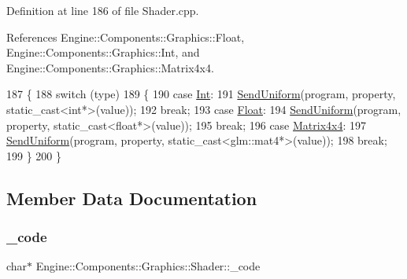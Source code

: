 Definition at line 186 of file Shader.\+cpp.



References Engine\+::\+Components\+::\+Graphics\+::\+Float, Engine\+::\+Components\+::\+Graphics\+::\+Int, and Engine\+::\+Components\+::\+Graphics\+::\+Matrix4x4.


\begin{DoxyCode}
187 \{
188     \textcolor{keywordflow}{switch} (type)
189     \{
190         \textcolor{keywordflow}{case} \mbox{\hyperlink{namespaceEngine_1_1Components_1_1Graphics_a44f5a2b57ee82aed849896c8311e403ba97d63336b89a741ffe735bc436147cc6}{Int}}:
191             \mbox{\hyperlink{classEngine_1_1Components_1_1Graphics_1_1Shader_a24131f3622fe536794de21e0fb499276}{SendUniform}}(program, property, static\_cast<int*>(value));
192             \textcolor{keywordflow}{break};
193         \textcolor{keywordflow}{case} \mbox{\hyperlink{namespaceEngine_1_1Components_1_1Graphics_a44f5a2b57ee82aed849896c8311e403bafe29186f6aeccd144f81352b67ea9c51}{Float}}:
194             \mbox{\hyperlink{classEngine_1_1Components_1_1Graphics_1_1Shader_a24131f3622fe536794de21e0fb499276}{SendUniform}}(program, property, static\_cast<float*>(value));
195             \textcolor{keywordflow}{break};
196         \textcolor{keywordflow}{case} \mbox{\hyperlink{namespaceEngine_1_1Components_1_1Graphics_a44f5a2b57ee82aed849896c8311e403babbf41bb0de18f4e8481bfb1372a99767}{Matrix4x4}}:
197             \mbox{\hyperlink{classEngine_1_1Components_1_1Graphics_1_1Shader_a24131f3622fe536794de21e0fb499276}{SendUniform}}(program, property, static\_cast<glm::mat4*>(value));
198             \textcolor{keywordflow}{break};
199     \}
200 \}
\end{DoxyCode}


\subsection{Member Data Documentation}
\mbox{\label{classEngine_1_1Components_1_1Graphics_1_1Shader_a82939e07025096b6b37f1588620863c5}} 
\subsubsection{\texorpdfstring{\+\_\+code}{\_code}}
{\footnotesize\ttfamily char$\ast$ Engine\+::\+Components\+::\+Graphics\+::\+Shader\+::\+\_\+code\hspace{0.3cm}{\ttfamily [private]}}



